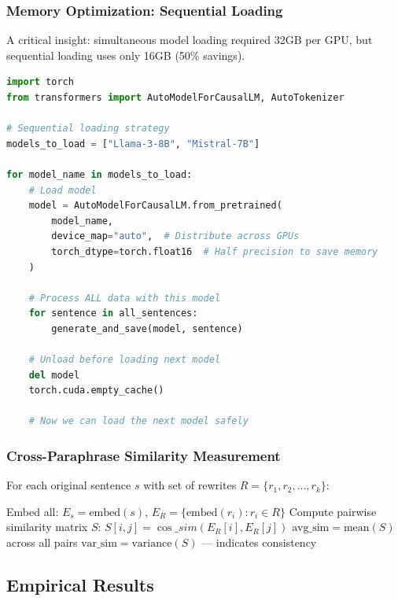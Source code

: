 \documentclass[12pt,a4paper,oneside]{report}
\begin{document}
\subsubsection{Memory Optimization: Sequential Loading}

A critical insight: simultaneous model loading required 32GB per GPU, but sequential loading uses only 16GB (50\% savings).

\begin{lstlisting}[language=Python, caption=Sequential Model Loading (Memory Efficient)]
import torch
from transformers import AutoModelForCausalLM, AutoTokenizer

# Sequential loading strategy
models_to_load = ["Llama-3-8B", "Mistral-7B"]

for model_name in models_to_load:
    # Load model
    model = AutoModelForCausalLM.from_pretrained(
        model_name,
        device_map="auto",  # Distribute across GPUs
        torch_dtype=torch.float16  # Half precision to save memory
    )

    # Process ALL data with this model
    for sentence in all_sentences:
        generate_and_save(model, sentence)

    # Unload before loading next model
    del model
    torch.cuda.empty_cache()

    # Now we can load the next model safely
\end{lstlisting}

\subsubsection{Cross-Paraphrase Similarity Measurement}

For each original sentence $s$ with set of rewrites $R = \{r_1, r_2, ..., r_k\}$:

\begin{algorithm}
\caption{Cross-Paraphrase Similarity}
\begin{algorithmic}
\State Embed all: $E_s = \text{embed}(s)$, $E_R = \{\text{embed}(r_i) : r_i \in R\}$
\State Compute pairwise similarity matrix $S$:
    \State $S[i,j] = \cos\_sim(E_R[i], E_R[j])$
\EndFor
\State $\text{avg\_sim} = \text{mean}(S)$ across all pairs
\State $\text{var\_sim} = \text{variance}(S)$ — indicates consistency
\end{algorithmic}
\end{algorithm}

\subsection{Empirical Results}
\end{document}
